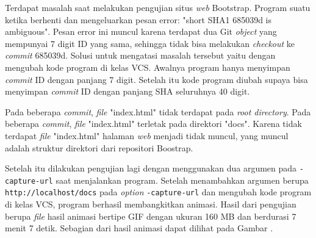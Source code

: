 \begin{enumerate}


Terdapat masalah saat melakukan pengujian situs \textit{web} Bootstrap. Program suatu ketika berhenti dan mengeluarkan pesan error: "short SHA1 685039d is ambiguous". Pesan error ini muncul karena terdapat dua Git \textit{object} yang mempunyai 7 digit ID yang sama, sehingga tidak bisa melakukan \textit{checkout} ke \textit{commit} 685039d. Solusi untuk mengatasi masalah tersebut yaitu dengan mengubah kode program di kelas VCS. Awalnya program hanya menyimpan \textit{commit} ID dengan panjang 7 digit. Setelah itu kode program diubah supaya bisa menyimpan \textit{commit} ID dengan panjang SHA seluruhnya 40 digit.

Pada beberapa \textit{commit}, \textit{file} "index.html" tidak terdapat pada \textit{root directory}. Pada beberapa \textit{commit}, \textit{file} "index.html" terletak pada direktori "docs". Karena tidak terdapat \textit{file} "index.html" halaman \textit{web} menjadi tidak muncul, yang muncul adalah struktur direktori dari repositori Boostrap. 

Setelah itu dilakukan pengujian lagi dengan menggunakan dua argumen pada \texttt{-capture-url}  saat menjalankan program. Setelah menambahkan argumen berupa \texttt{http://localhost/docs} pada \textit{option} \texttt{-capture-url} dan mengubah kode program di kelas VCS, program berhasil membangkitkan animasi. Hasil dari pengujian berupa \textit{file} hasil animasi bertipe GIF dengan ukuran 160 MB dan berdurasi 7 menit 7 detik. Sebagian dari hasil animasi dapat dilihat pada Gambar .






\end{enumerate}
